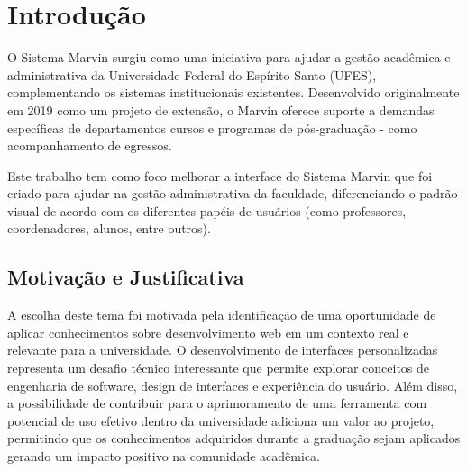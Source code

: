 \chapter{Introdução}
\label{sec-intro}




O Sistema Marvin surgiu como uma iniciativa para ajudar a gestão acadêmica e administrativa da Universidade Federal do Espírito Santo (UFES), complementando os sistemas institucionais existentes. Desenvolvido originalmente em 2019 como um projeto de extensão, o Marvin oferece suporte a demandas específicas de departamentos cursos e programas de pós-graduação - como acompanhamento de egressos.

Este trabalho tem como foco melhorar a interface do Sistema Marvin que foi criado para ajudar na gestão administrativa da faculdade, diferenciando o padrão visual de acordo com os diferentes papéis de usuários (como professores, coordenadores, alunos, entre outros).

\section{Motivação e Justificativa}
\label{sec-intro-motjus}


A escolha deste tema foi motivada pela identificação de uma oportunidade de aplicar conhecimentos sobre desenvolvimento web em um contexto real e relevante para a universidade. O desenvolvimento de interfaces personalizadas representa um desafio técnico interessante que permite explorar conceitos de engenharia de software, design de interfaces e experiência do usuário. Além disso, a possibilidade de contribuir para o aprimoramento de uma ferramenta com potencial de uso efetivo dentro da universidade adiciona um valor ao projeto, permitindo que os conhecimentos adquiridos durante a graduação sejam aplicados gerando um impacto positivo na comunidade acadêmica.

